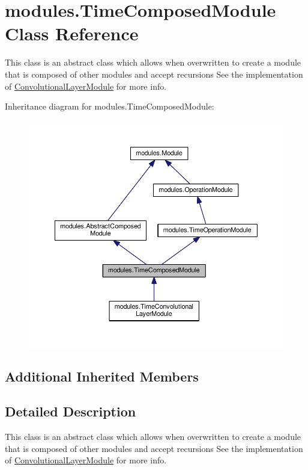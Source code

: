 \hypertarget{classmodules_1_1_time_composed_module}{}\section{modules.\+Time\+Composed\+Module Class Reference}
\label{classmodules_1_1_time_composed_module}


This class is an abstract class which allows when overwritten to create a module that is composed of other modules and accept recursions See the implementation of \hyperlink{classmodules_1_1_convolutional_layer_module}{Convolutional\+Layer\+Module} for more info.  




Inheritance diagram for modules.\+Time\+Composed\+Module\+:\nopagebreak
\begin{figure}[H]
\begin{center}
\leavevmode
\includegraphics[width=350pt]{classmodules_1_1_time_composed_module__inherit__graph}
\end{center}
\end{figure}
\subsection*{Additional Inherited Members}


\subsection{Detailed Description}
This class is an abstract class which allows when overwritten to create a module that is composed of other modules and accept recursions See the implementation of \hyperlink{classmodules_1_1_convolutional_layer_module}{Convolutional\+Layer\+Module} for more info. 

